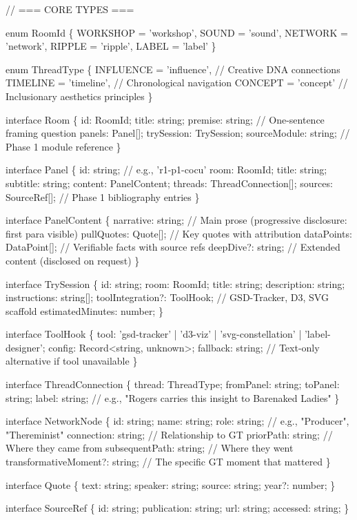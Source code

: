 \documentclass[11pt,letterpaper]{article}
\begin{document}
\begin{asciibox}
// === CORE TYPES ===

enum RoomId \{
  WORKSHOP = 'workshop',
  SOUND = 'sound',
  NETWORK = 'network',
  RIPPLE = 'ripple',
  LABEL = 'label'
\}

enum ThreadType \{
  INFLUENCE = 'influence',   // Creative DNA connections
  TIMELINE = 'timeline',     // Chronological navigation
  CONCEPT = 'concept'        // Inclusionary aesthetics principles
\}

interface Room \{
  id: RoomId;
  title: string;
  premise: string;          // One-sentence framing question
  panels: Panel[];
  trySession: TrySession;
  sourceModule: string;     // Phase 1 module reference
\}

interface Panel \{
  id: string;               // e.g., 'r1-p1-cocu'
  room: RoomId;
  title: string;
  subtitle: string;
  content: PanelContent;
  threads: ThreadConnection[];
  sources: SourceRef[];     // Phase 1 bibliography entries
\}

interface PanelContent \{
  narrative: string;        // Main prose (progressive disclosure: first para visible)
  pullQuotes: Quote[];      // Key quotes with attribution
  dataPoints: DataPoint[];  // Verifiable facts with source refs
  deepDive?: string;        // Extended content (disclosed on request)
\}

interface TrySession \{
  id: string;
  room: RoomId;
  title: string;
  description: string;
  instructions: string[];
  toolIntegration?: ToolHook;  // GSD-Tracker, D3, SVG scaffold
  estimatedMinutes: number;
\}

interface ToolHook \{
  tool: 'gsd-tracker' | 'd3-viz' | 'svg-constellation' | 'label-designer';
  config: Record<string, unknown>;
  fallback: string;           // Text-only alternative if tool unavailable
\}

interface ThreadConnection \{
  thread: ThreadType;
  fromPanel: string;
  toPanel: string;
  label: string;              // e.g., "Rogers carries this insight to Barenaked Ladies"
\}

interface NetworkNode \{
  id: string;
  name: string;
  role: string;               // e.g., "Producer", "Thereminist"
  connection: string;         // Relationship to GT
  priorPath: string;          // Where they came from
  subsequentPath: string;     // Where they went
  transformativeMoment?: string;  // The specific GT moment that mattered
\}

interface Quote \{
  text: string;
  speaker: string;
  source: string;
  year?: number;
\}

interface SourceRef \{
  id: string;
  publication: string;
  url: string;
  accessed: string;
\}
\end{asciibox}
\end{document}
